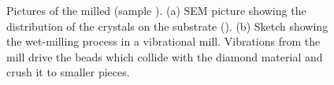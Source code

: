 	\begin{figure}[tp]
		\begin{subfigure}[t]{ 0.49\linewidth}
			\caption{}\label{subfig::sem_milled}
			\centering
		\end{subfigure}
		\hfill
		\begin{subfigure}[t]{ 0.49\linewidth}
			\caption{}\label{subfig::sketch_milling}
			\centering
		\end{subfigure}
		\caption{Pictures of the milled \nds (sample \insituH). (a) SEM picture showing the distribution of the \nd crystals on the \ir substrate (). (b) Sketch showing the wet-milling process in a vibrational mill. Vibrations from the mill drive the beads which collide with the diamond material and crush it to smaller pieces.}
		\label{fig::sem_millling}
	\end{figure}

